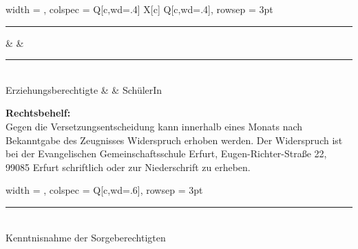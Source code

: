 {\begin{minipage}[t][.99\textheight][t]{.97\textwidth}
		\vspace{2.5cm}\par
		\begin{tblr}{
				width   = \linewidth,
				colspec = {Q[c,wd=.4\linewidth] X[c] Q[c,wd=.4\linewidth]},
				rowsep  = 3pt
			}
			\rule{\linewidth}{1pt} & & \rule{\linewidth}{1pt}\\
			{\centering Erziehungsberechtigte} & &
			{\centering SchülerIn}
		\end{tblr}
		
		\vfill
		
		{\footnotesize
			\textbf{Rechtsbehelf:}\\
			Gegen die Versetzungsentscheidung kann innerhalb eines Monats nach
			Bekanntgabe des Zeugnisses Widerspruch erhoben werden. Der Widerspruch
			ist bei der Evangelischen Gemeinschaftsschule Erfurt,
			Eugen-Richter-Straße 22, 99085 Erfurt schriftlich oder zur Niederschrift
			zu erheben.\\[3em]
			
			\begin{tblr}{
					width   = \linewidth,
					colspec = {Q[c,wd=.6\linewidth]},
					rowsep  = 3pt
				}
				\rule{\linewidth}{1pt}\\[-.3ex]
				{\centering Kenntnisnahme der Sorgeberechtigten}
			\end{tblr}
		}
	\end{minipage}%
}%
